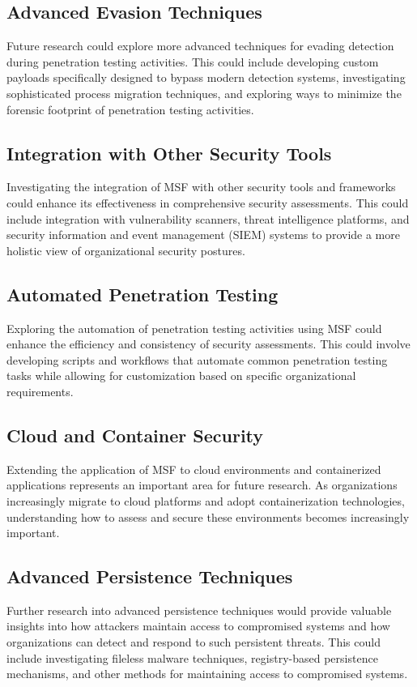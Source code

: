 \documentclass[journal,twoside]{IEEEtran}
\begin{document}
\subsection{Advanced Evasion Techniques}
Future research could explore more advanced techniques for evading detection during penetration testing activities. This could include developing custom payloads specifically designed to bypass modern detection systems, investigating sophisticated process migration techniques, and exploring ways to minimize the forensic footprint of penetration testing activities.

\subsection{Integration with Other Security Tools}
Investigating the integration of MSF with other security tools and frameworks could enhance its effectiveness in comprehensive security assessments. This could include integration with vulnerability scanners, threat intelligence platforms, and security information and event management (SIEM) systems to provide a more holistic view of organizational security postures.

\subsection{Automated Penetration Testing}
Exploring the automation of penetration testing activities using MSF could enhance the efficiency and consistency of security assessments. This could involve developing scripts and workflows that automate common penetration testing tasks while allowing for customization based on specific organizational requirements.

\subsection{Cloud and Container Security}
Extending the application of MSF to cloud environments and containerized applications represents an important area for future research. As organizations increasingly migrate to cloud platforms and adopt containerization technologies, understanding how to assess and secure these environments becomes increasingly important.

\subsection{Advanced Persistence Techniques}
Further research into advanced persistence techniques would provide valuable insights into how attackers maintain access to compromised systems and how organizations can detect and respond to such persistent threats. This could include investigating fileless malware techniques, registry-based persistence mechanisms, and other methods for maintaining access to compromised systems.
\end{document}
